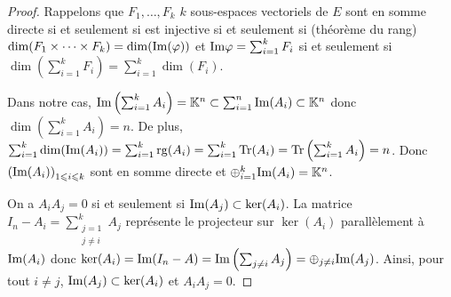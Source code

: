 \documentclass[12pt]{article}
\begin{document}
\begin{proof}
    Rappelons que $F_1,\dots,F_k$ $k$ sous-espaces vectoriels de $E$ sont en somme directe si et seulement si 
     est injective si et seulement si (théorème du rang) $\dim(F_1\times\dots\times F_k)=\dim(\mathrm{Im}(\varphi))$ et $\mathrm{Im}\varphi=\sum_{i=1}^{k}F_i$ si et seulement si $\dim(\sum_{i=1}^{k}F_i)=\sum_{i=1}^{k}\dim(F_i)$.

    Dans notre cas, $\mathrm{Im}\left(\sum_{i=1}^{k}A_i\right)=\mathbb{K}^{n}\subset\sum_{i=1}^{n}\mathrm{Im}(A_i)\subset\mathbb{K}^{n}$ donc $\dim\left(\sum_{i=1}^{k}A_i\right)=n$. De plus, $\sum_{i=1}^{k}\dim(\mathrm{Im}(A_i))=\sum_{i=1}^{k}\operatorname{rg}(A_i)=\sum_{i=1}^{k}\operatorname{Tr}(A_i)=\operatorname{Tr}\left(\sum_{i=1}^{k}A_i\right)=n$. Donc $\left(\mathrm{Im}(A_i)\right)_{1\leqslant i\leqslant k}$ sont en somme directe et $\oplus_{i=1}^{k}\mathrm{Im}(A_i)=\mathbb{K}^{n}$.

    On a $A_iA_j=0$ si et seulement si $\mathrm{Im}(A_j)\subset\ker(A_i)$. La matrice $I_n-A_i=\sum_{\substack{j=1\\j\neq i}}^{k}A_j$ représente le projecteur sur $\ker(A_i)$ parallèlement à $\mathrm{Im}(A_i)$ donc $\ker(A_i)=\mathrm{Im}(I_n-A)=\mathrm{Im}\left(\sum_{j\neq i}A_j\right)=\oplus_{j\neq i}\mathrm{Im}(A_j)$. Ainsi, pour tout $i\neq j$, $\mathrm{Im}(A_j)\subset\ker(A_i)$ et $A_iA_j=0$.
\end{proof}
\end{document}
